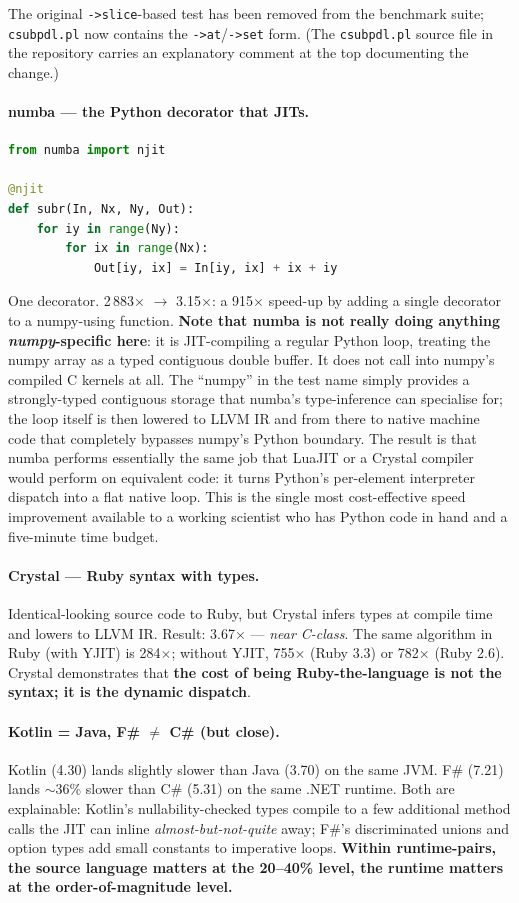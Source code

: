 \documentclass[11pt,a4paper]{article}
\begin{document}
The original \verb|->slice|-based test has been removed from the
benchmark suite; \texttt{csubpdl.pl} now contains the
\verb|->at|/\verb|->set| form. (The \texttt{csubpdl.pl} source
file in the repository carries an explanatory comment at the top
documenting the change.)

\paragraph{numba --- the Python decorator that JITs.}
\begin{lstlisting}[language=Python]
from numba import njit

@njit
def subr(In, Nx, Ny, Out):
    for iy in range(Ny):
        for ix in range(Nx):
            Out[iy, ix] = In[iy, ix] + ix + iy
\end{lstlisting}

\noindent
One decorator. \mbox{2\,883$\times$} $\rightarrow$ \mbox{3.15$\times$}: a
915$\times$ speed-up by adding a single decorator to a numpy-using
function. \textbf{Note that numba is not really doing anything
\emph{numpy}-specific here}: it is JIT-compiling a regular Python
loop, treating the numpy array as a typed contiguous double buffer.
It does not call into numpy's compiled C kernels at all. The
``numpy'' in the test name simply provides a strongly-typed
contiguous storage that numba's type-inference can specialise for;
the loop itself is then lowered to LLVM IR and from there to native
machine code that completely bypasses numpy's Python boundary. The
result is that numba performs essentially the same job that LuaJIT
or a Crystal compiler would perform on equivalent code: it turns
Python's per-element interpreter dispatch into a flat native loop.
This is the single most cost-effective speed improvement available
to a working scientist who has Python code in hand and a five-minute
time budget.

\paragraph{Crystal --- Ruby syntax with types.}
Identical-looking source code to Ruby, but Crystal infers types at
compile time and lowers to LLVM IR. Result: 3.67$\times$ ---
\emph{near C-class}. The same algorithm in Ruby (with YJIT) is
284$\times$; without YJIT, 755$\times$ (Ruby 3.3) or 782$\times$
(Ruby 2.6). Crystal demonstrates that
\textbf{the cost of being Ruby-the-language is not the syntax; it
is the dynamic dispatch}.

\paragraph{Kotlin = Java, F\# $\neq$ C\# (but close).}
Kotlin (4.30) lands slightly slower than Java (3.70) on the same
JVM. F\# (7.21) lands $\sim$36\% slower than C\# (5.31) on the same
.NET runtime. Both are explainable: Kotlin's nullability-checked
types compile to a few additional method calls the JIT can inline
\emph{almost-but-not-quite} away; F\#'s discriminated unions and
option types add small constants to imperative loops. \textbf{Within
runtime-pairs, the source language matters at the
20--40\% level, the runtime matters at the order-of-magnitude
level.}
\end{document}
